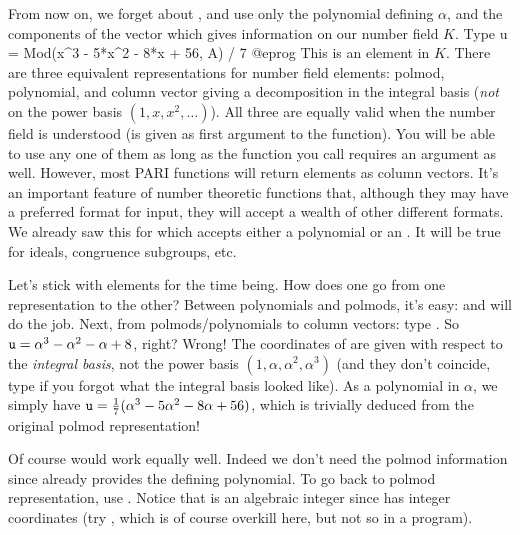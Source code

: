 From now on, we forget about , and use only the polynomial
 defining $\alpha$, and the components of the vector  which
gives information on our number field $K$. Type
\bprog
  u = Mod(x^3 - 5*x^2 - 8*x + 56, A) / 7
@eprog\noindent
This is an element in $K$. There are three equivalent
representations for number field elements: polmod, polynomial, and column
vector giving a decomposition in the integral basis  (\emph{not} on
the power basis $(1,x,x^2,\dots)$). All three are equally valid when the
number field is understood (is given as first argument to the function).
You will be able to use any one of them as long as the function you call
requires an  argument as well. However, most PARI functions will
return elements as column vectors. It's an important feature of number
theoretic functions that, although they may have a preferred format for
input, they will accept a wealth of other different formats. We already saw
this for  which accepts either a polynomial or an . It
will be true for ideals, congruence subgroups, etc.

  Let's stick with elements for the time being. How does one go from one
representation to the other? Between polynomials and polmods, it's easy:
 and  will do the job. Next, from polmods/polynomials to
column vectors: type . So ${\tt u} = \alpha^3-
\alpha^2 - \alpha + 8$, right? Wrong! The coordinates of  are given
with respect to the \emph{integral basis}, not the power basis
$(1,\alpha,\alpha^2,\alpha^3)$ (and they don't coincide, type  if
you forgot what the integral basis looked like). As a polynomial in $\alpha$,
we simply have ${\tt u} = {1\over7}(\alpha^3 - 5\alpha^2-8\alpha+56)$, which
is trivially deduced from the original polmod representation!

Of course  would work equally well. Indeed
we don't need the polmod information since  already provides the
defining polynomial. To go back to polmod representation, use
. Notice that  is an algebraic integer since
 has integer coordinates (try , which is of
course overkill here, but not so in a program).

